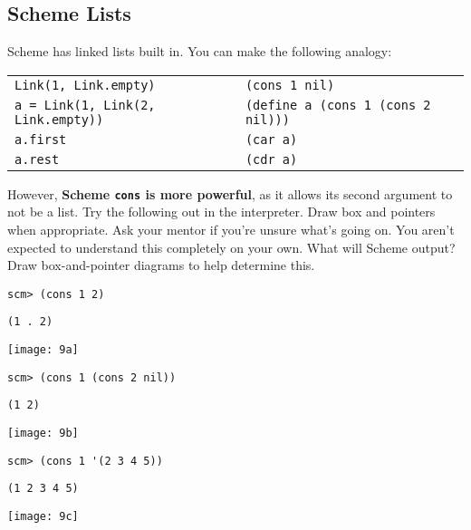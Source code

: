\documentclass{exam}
\begin{document}
\begin{questions}
\section{Scheme Lists}
\begin{blocksection}
\begin{nonsol}
Scheme has linked lists built in. You can make the following analogy:
\begin{center}
\begin{tabular}{ |l|l| }
\hline
 \texttt{Link(1, Link.empty)} & \texttt{(cons 1 nil)} \\
 \texttt{a = Link(1, Link(2, Link.empty))} & \texttt{(define a (cons 1 (cons 2 nil)))}  \\
 \texttt{a.first} & \texttt{(car a)} \\
 \texttt{a.rest} & \texttt{(cdr a)} \\
 \hline
\end{tabular}
\end{center}
However, \textbf{Scheme \texttt{cons} is more powerful}, as it allows its second argument to not be a list. Try the following out in the interpreter. Draw box and pointers when appropriate. Ask your mentor if you're unsure what's going on. You aren't expected to understand this completely on your own.
\question What will Scheme output? Draw box-and-pointer diagrams to help determine this.
\end{nonsol}

\begin{lstlisting}
scm> (cons 1 2)
\end{lstlisting}
\begin{solution}[0.25in]
\texttt{(1 . 2)}
\begin{center}
\texttt{[image: 9a]}
\end{center}
\end{solution}

\begin{lstlisting}
scm> (cons 1 (cons 2 nil))
\end{lstlisting}
\begin{solution}[0.25in]
\texttt{(1 2)}
\begin{center}
\texttt{[image: 9b]}
\end{center}
\end{solution}

\begin{lstlisting}
scm> (cons 1 '(2 3 4 5))
\end{lstlisting}
\begin{solution}[0.25in]
\texttt{(1 2 3 4 5)}
\begin{center}
\texttt{[image: 9c]}
\end{center}
\end{solution}


\end{blocksection}
\end{questions}
\end{document}
